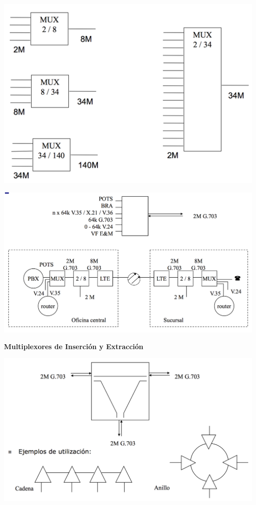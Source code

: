 \documentclass[10pt,portrait, twocolumn]{article}
\begin{document}
	\begin{center}
		\includegraphics[scale=0.2]{images/Mux}
	\end{center}

	\begin{center}
		\includegraphics[scale=0.2]{images/MuxTerminal}
	\end{center}

\textbf{Multiplexores de Inserción y Extracción}

	\begin{center}
		\includegraphics[scale=0.2]{images/MuxExtra}
	\end{center}
\end{document}
